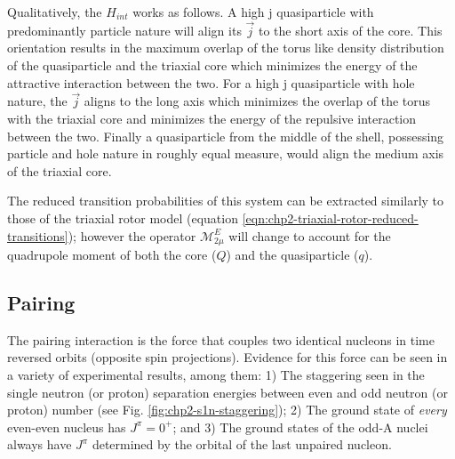 Qualitatively, the $H_{int}$ works as follows. A high j quasiparticle with predominantly particle nature will align its $\vec{j}$ to the short axis of the core. This orientation results in the maximum overlap of the torus like density distribution of the quasiparticle and the triaxial core which minimizes the energy of the attractive interaction between the two. For a high j quasiparticle with hole nature, the $\vec{j}$ aligns to the long axis which minimizes the overlap of the torus with the triaxial core and minimizes the energy of the repulsive interaction between the two. Finally a quasiparticle from the middle of the shell, possessing particle and hole nature in roughly equal measure, would align the medium axis of the triaxial core.

The reduced transition probabilities of this system can be extracted similarly to those of the triaxial rotor model (equation \ref{eqn:chp2-triaxial-rotor-reduced-transitions}); however the operator $\mathcal{M}^E_{2\mu}$ will change to account for the quadrupole moment of both the core ($Q$) and the quasiparticle ($q$).

\subsection{Pairing}
\label{ssec:models-pairing}
The pairing interaction is the force that couples two identical nucleons in time reversed orbits (opposite spin projections). Evidence for this force can be seen in a variety of experimental results, among them: 1) The staggering seen in the single neutron (or proton) separation energies between even and odd neutron (or proton) number (see Fig. \ref{fig:chp2-s1n-staggering}); 2) The ground state of \emph{every} even-even nucleus has $J^{\pi}=0^+$; and 3) The ground states of the odd-A nuclei always have $J^{\pi}$ determined by the orbital of the last unpaired nucleon.

